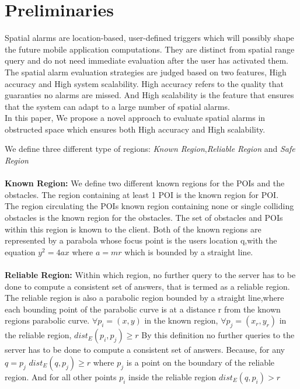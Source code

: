 \section{Preliminaries}
Spatial alarms are location-based, user-defined triggers which will possibly shape the future mobile application computations. They are distinct from spatial range query and do not need immediate evaluation after the user has activated them. The spatial alarm evaluation strategies are judged based on two features, High accuracy and High system scalability. High accuracy refers to the quality that guaranties no alarms are missed. And High scalability is the feature that ensures that the system can adapt to a large number of spatial alarms.\\
In this paper, We propose a novel approach to evaluate spatial alarms in obstructed space which ensures both High accuracy and High scalability.

We define three different type of regions: \textit{Known Region},\textit{Reliable Region} and \textit{Safe Region}\\ \\

\textbf{Known Region:} We define two different known regions for the POIs and the obstacles. The region containing at least 1 POI is the known region for POI.\\
The region circulating the POIs known region containing none or single colliding obstacles is the known region for the obstacles. The set of obstacles and POIs within this region is known to the client. 
Both of the known regions are represented by a parabola whose focus point is the users location q,with the equation $y^2=4ax$ where $a=mr$ which is bounded by a straight line. \\ \\


\textbf{Reliable Region:} Within which region, no further query to the server has to be done to compute a consistent set of answers, that is termed as a reliable region. The reliable region is also a parabolic region bounded by a straight line,where each bounding point of the parabolic curve is at a distance r from the known regions parabolic curve. $ \forall p_i=(x,y) $ in the known region, $ \forall p_j=(x_r,y_r) $ in the reliable region, $ dist_E(p_i,p_j)\geq r $ By this definition no further queries to the server has to be done to compute a consistent set of answers. Because, for any $q =p_j$ $ dist_E(q,p_j) \geq r$ where $p_j$ is a point on the boundary of the reliable region. And for all other points $ p_i $ inside the reliable region $  dist_E(q,p_i)>r$ \\ \\


